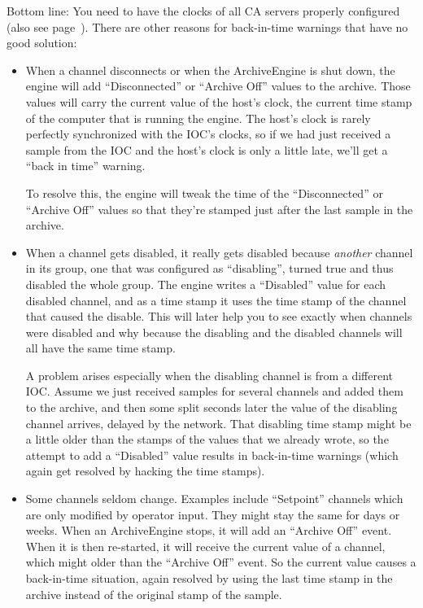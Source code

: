 Bottom line: You need to have the clocks of all CA servers properly configured
(also see page~\pageref{back:in:time}).
There are other reasons for back-in-time warnings that have no good
solution:
\begin{itemize}
\item When a channel disconnects or when the ArchiveEngine is shut
  down, the engine will add ``Disconnected'' or ``Archive Off'' values
  to the archive. Those values will carry the current value of the
  host's clock, the current time stamp of the computer that is running
  the engine. The host's clock is rarely perfectly synchronized with
  the IOC's clocks, so if we had just received a sample from the IOC
  and the host's clock is only a little late, we'll get a ``back in
  time'' warning.

  To resolve this, the engine will tweak the time of the
  ``Disconnected'' or ``Archive Off'' values so that they're stamped
  just after the last sample in the archive.

\item When a channel gets disabled, it really gets disabled because
  \emph{another} channel in its group, one that was configured as
  ``disabling'', turned true and thus disabled the whole group.
  The engine writes a ``Disabled'' value for each disabled channel,
  and as a time stamp it uses the time stamp of the channel that
  caused the disable.
  This will later help you to see exactly when channels were disabled
  and why because the disabling and the disabled channels will all
  have the same time stamp.

  A problem arises especially when the disabling channel is from a
  different IOC. Assume we just received samples for several channels
  and added them to the archive, and then some split seconds later the
  value of the disabling channel arrives, delayed by the network. That
  disabling time stamp might be a little older than the stamps of the
  values that we already wrote, so the attempt to add a ``Disabled''
  value results in back-in-time warnings (which again get resolved by
  hacking the time stamps).

\item Some channels seldom change. Examples include ``Setpoint''
  channels which are only modified by operator input. They might stay
  the same for days or weeks.
  When an ArchiveEngine stops, it will add an ``Archive Off''
  event. When it is then re-started, it will receive the current
  value of a channel, which might older than the
  ``Archive Off'' event. So the current value causes a back-in-time
  situation, again resolved by using the last time stamp in the
  archive instead of the original stamp of the sample.
\end{itemize}

